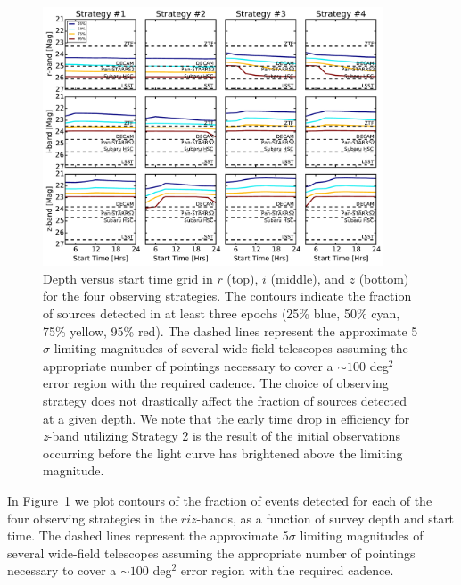 \begin{figure}[t!]
\centering
\includegraphics[width=0.9\textwidth]{./figs/chapter2/ch2_f4.pdf}
\caption{Depth versus start time grid in $r$ (top), $i$ (middle), and $z$ (bottom) for the four observing strategies. The contours indicate the fraction of sources detected in at least three epochs (25\% blue, 50\% cyan, 75\% yellow, 95\% red). The dashed lines represent the approximate 5$\sigma$ limiting magnitudes of several wide-field telescopes assuming the appropriate number of pointings necessary to cover a $\sim 100$ deg$^2$ error region with the required cadence. The choice of observing strategy does not drastically affect the fraction of sources detected at a given depth. We note that the early time drop in efficiency for {\em z}-band utilizing Strategy 2 is the result of the initial observations occurring before the light curve has brightened above the limiting magnitude.}
\label{fig:det}
\end{figure}
   
In Figure~\ref{fig:det} we plot contours of the fraction of events detected for each of the four observing strategies in the $riz$-bands, as a function of survey depth and start time. The dashed lines represent the approximate 5$\sigma$ limiting magnitudes of several wide-field telescopes assuming the appropriate number of pointings necessary to cover a $\sim 100$ deg$^2$ error region with the required cadence.
   
